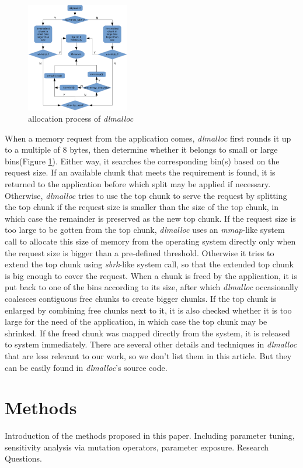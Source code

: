 \documentclass{acm_proc_article-sp}
\begin{document}
\begin{figure}[htbp]
\centering
\includegraphics[width=0.4\textwidth]{fig8}
\caption{allocation process of \emph{dlmalloc}}\label{fig_8}
\end{figure}
When a memory request from the application comes, \emph{dlmalloc} first rounds it up to a multiple of 8 bytes, then determine whether it belongs to small or large bins(Figure \ref{fig_8}). Either way, it searches the corresponding bin(s) based on the request size. If an available chunk that meets the requirement is found, it is returned to the application before which split may be applied if necessary. Otherwise, \emph{dlmalloc} tries to use the top chunk to serve the request by splitting the top chunk if the request size is smaller than the size of the top chunk, in which case the remainder is preserved as the new top chunk. If the request size is too large to be gotten from the top chunk, \emph{dlmalloc} uses an \emph{mmap}-like system call to allocate this size of memory from the operating system directly only when the request size is bigger than a pre-defined threshold. Otherwise it tries to extend the top chunk using \emph{sbrk}-like system call, so that the extended top chunk is big enough to cover the request.
When a chunk is freed by the application, it is put back to one of the bins according to its size, after which \emph{dlmalloc} occasionally coalesces contiguous free chunks to create bigger chunks. If the top chunk is enlarged by combining free chunks next to it, it is also checked whether it is too large for the need of the application, in which case the top chunk may be shrinked. If the freed chunk was mapped directly from the system, it is released to system immediately. 
There are several other details and techniques in \emph{dlmalloc} that are less relevant to our work, so we don't list them in this article. But they can be easily found in \emph{dlmalloc}'s source code.

\section{Methods}
Introduction of the methods proposed in this paper. Including parameter tuning, sensitivity analysis via mutation operators, parameter exposure. Research Questions.
\end{document}
